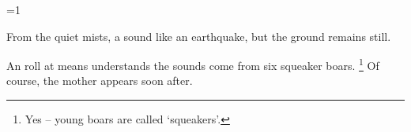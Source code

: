 \ifnum\value{cycle}=1

\begin{boxtext}
  From the quiet mists, a sound like an earthquake, but the ground remains still.
\end{boxtext}

An  roll at \tn[10] means  understands the sounds come from six squeaker boars.%
\footnote{Yes -- young boars are called `squeakers'.}
Of course, the mother appears soon after.

\boar

\fi


